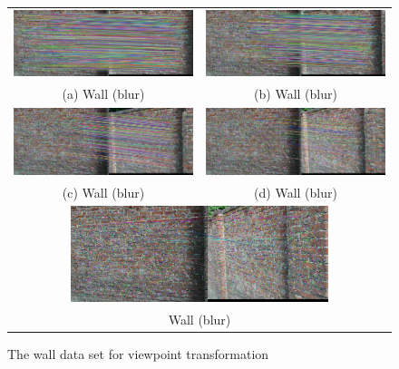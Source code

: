 \begin{figure}[H]
\begin{tabular}{cc}
  \includegraphics[width=75mm]{figures/wall_final_1_2} &  \includegraphics[width=75mm]{figures/wall_final_1_3} \\
(a) Wall (blur) & (b) Wall (blur) \\[6pt]
  \includegraphics[width=75mm]{figures/wall_final_1_4} &  \includegraphics[width=75mm]{figures/wall_final_1_5} \\
(c) Wall (blur) & (d) Wall (blur) \\[6pt]
  \multicolumn{2}{c}{\includegraphics[width=75mm]{figures/wall_final_1_6}} \\
  \multicolumn{2}{c}{Wall (blur)} \\[6pt]
\end{tabular}
\caption{The wall data set for viewpoint transformation}\label{fig:epipolar_matching_wall}
\end{figure}

